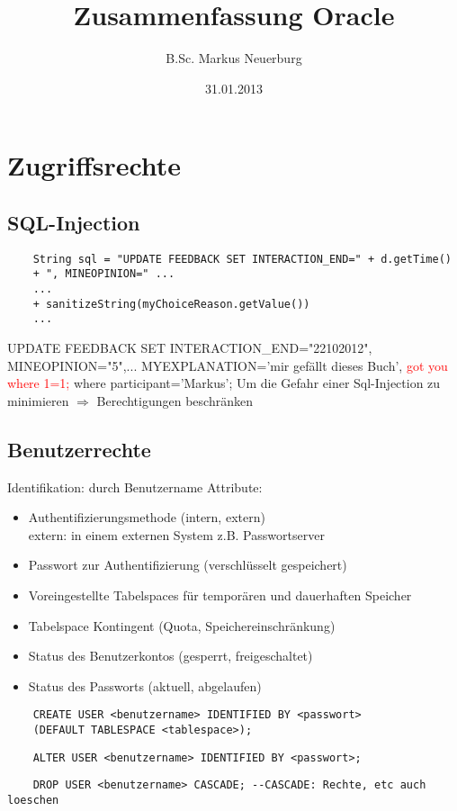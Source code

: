 \documentclass[12pt]{scrreprt}
\title{Zusammenfassung Oracle}
\author{B.Sc. Markus Neuerburg}
\date{31.01.2013}
\begin{document}
\setlength{\topmargin}{0cm}
\parindent 0pt
\chapter{Zugriffsrechte}
\section{SQL-Injection}
\begin{lstlisting}
	String sql = "UPDATE FEEDBACK SET INTERACTION_END=" + d.getTime()
	+ ", MINEOPINION=" ...
	...
	+ sanitizeString(myChoiceReason.getValue())
	...
\end{lstlisting}
UPDATE FEEDBACK SET\newline
INTERACTION\_END="22102012",\newline
MINEOPINION="5",...
MYEXPLANATION='mir gefällt dieses Buch',\newline
\hspace*{5mm}\textcolor{red}{got you where 1=1;}\newline
where participant='Markus';\newline
\newline
Um die Gefahr einer Sql-Injection zu minimieren $\Rightarrow$ Berechtigungen beschränken\newline
\newline
\section{Benutzerrechte}
Identifikation: durch Benutzername\newline
Attribute:
\begin{itemize}
	\item Authentifizierungsmethode (intern, extern)\hfill \\
	extern: in einem externen System z.B. Passwortserver
	\item Passwort zur Authentifizierung (verschlüsselt gespeichert)
	\item Voreingestellte Tabelspaces für temporären und dauerhaften Speicher
	\item Tabelspace Kontingent (Quota, Speichereinschränkung)
	\item Status des Benutzerkontos (gesperrt, freigeschaltet)
	\item Status des Passworts (aktuell, abgelaufen)
\end{itemize}
\begin{lstlisting}
	CREATE USER <benutzername> IDENTIFIED BY <passwort>
	(DEFAULT TABLESPACE <tablespace>);
\end{lstlisting}
\begin{lstlisting}
	ALTER USER <benutzername> IDENTIFIED BY <passwort>;
\end{lstlisting}
\begin{lstlisting}
	DROP USER <benutzername> CASCADE; --CASCADE: Rechte, etc auch loeschen
\end{lstlisting}
\end{document}
